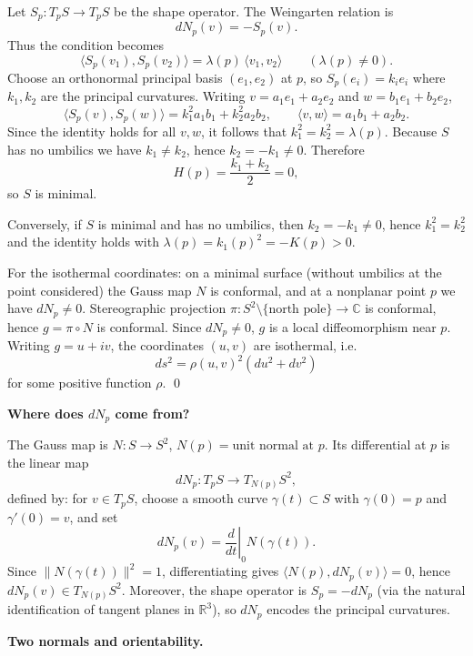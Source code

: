 \begin{solution}
Let $S_p:T_pS\to T_pS$ be the shape operator. The Weingarten relation is
	\[
	dN_p(v)=-S_p(v).
	\]
	Thus the condition becomes
	\[
	\langle S_p(v_1), S_p(v_2)\rangle = \lambda(p)\,\langle v_1,v_2\rangle
	\qquad(\lambda(p)\neq 0).
	\]
	Choose an orthonormal principal basis $(e_1,e_2)$ at $p$, so $S_p(e_i)=k_i e_i$ where $k_1,k_2$ are the
	principal curvatures. Writing $v=a_1e_1+a_2e_2$ and $w=b_1e_1+b_2e_2$,
	\[
	\langle S_p(v),S_p(w)\rangle = k_1^2 a_1b_1 + k_2^2 a_2b_2,\qquad
	\langle v,w\rangle = a_1b_1+a_2b_2.
	\]
	Since the identity holds for all $v,w$, it follows that $k_1^2=k_2^2=\lambda(p)$.
	Because $S$ has no umbilics we have $k_1\neq k_2$, hence $k_2=-k_1\neq 0$.
	Therefore
	\[
	H(p)=\frac{k_1+k_2}{2}=0,
	\]
	so $S$ is minimal.
	
	Conversely, if $S$ is minimal and has no umbilics, then $k_2=-k_1\neq 0$, hence $k_1^2=k_2^2$ and the
	identity holds with $\lambda(p)=k_1(p)^2=-K(p)>0$.
	
	\medskip
	For the isothermal coordinates: on a minimal surface (without umbilics at the point considered) the Gauss map
	$N$ is conformal, and at a nonplanar point $p$ we have $dN_p\neq 0$.
	Stereographic projection $\pi:S^2\setminus\{\text{north pole}\}\to\mathbb C$ is conformal, hence
	$g=\pi\circ N$ is conformal. Since $dN_p\neq 0$, $g$ is a local diffeomorphism near $p$.
	Writing $g=u+iv$, the coordinates $(u,v)$ are isothermal, i.e.
	\[
	ds^2 = \rho(u,v)^2(du^2+dv^2)
	\]
	for some positive function $\rho$.
	\qed
	
	
	\par\medskip\noindent\textbf{Where does $dN_p$ come from?}\par\smallskip

	The Gauss map is $N:S\to S^2$, $N(p)=\text{unit normal at }p$.
	Its differential at $p$ is the linear map
	\[
	dN_p:T_pS\to T_{N(p)}S^2,
	\]
	defined by: for $v\in T_pS$, choose a smooth curve $\gamma(t)\subset S$ with
	$\gamma(0)=p$ and $\gamma'(0)=v$, and set
	\[
	dN_p(v)=\left.\frac{d}{dt}\right|_{0}N(\gamma(t)).
	\]
	Since $\|N(\gamma(t))\|^2=1$, differentiating gives
	$\langle N(p),dN_p(v)\rangle=0$, hence $dN_p(v)\in T_{N(p)}S^2$.
	Moreover, the shape operator is $S_p=-dN_p$ (via the natural identification of tangent planes in $\mathbb{R}^3$),
	so $dN_p$ encodes the principal curvatures.
	
	\par\medskip\noindent\textbf{Two normals and orientability.}\par\smallskip


\end{solution}
